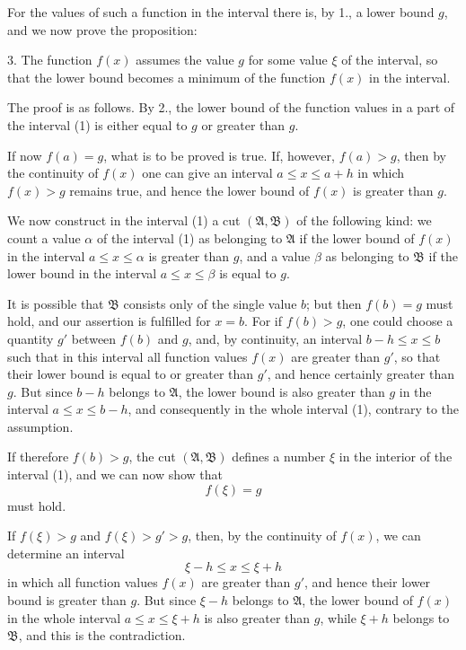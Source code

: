 \documentclass[11pt]{article}
\begin{document}
For the values of such a function in the interval there is, by 1., a lower bound $g$, and we now prove the proposition:

3. The function $f(x)$ assumes the value $g$ for some value $\xi$ of the interval, so that the lower bound becomes a minimum of the function $f(x)$ in the interval.

The proof is as follows. By 2., the lower bound of the function values in a part of the interval (1) is either equal to $g$ or greater than $g$.

If now $f(a)=g$, what is to be proved is true. If, however, $f(a)>g$, then by the continuity of $f(x)$ one can give an interval $a\le x\le a+h$ in which $f(x)>g$ remains true, and hence the lower bound of $f(x)$ is greater than $g$.

We now construct in the interval (1) a cut $(\mathfrak A,\mathfrak B)$ of the following kind: we count a value $\alpha$ of the interval (1) as belonging to $\mathfrak A$ if the lower bound of $f(x)$ in the interval $a\le x\le \alpha$ is greater than $g$, and a value $\beta$ as belonging to $\mathfrak B$ if the lower bound in the interval $a\le x\le \beta$ is equal to $g$.

It is possible that $\mathfrak B$ consists only of the single value $b$; but then $f(b)=g$ must hold, and our assertion is fulfilled for $x=b$. For if $f(b)>g$, one could choose a quantity $g'$ between $f(b)$ and $g$, and, by continuity, an interval $b-h\le x\le b$ such that in this interval all function values $f(x)$ are greater than $g'$, so that their lower bound is equal to or greater than $g'$, and hence certainly greater than $g$. But since $b-h$ belongs to $\mathfrak A$, the lower bound is also greater than $g$ in the interval $a\le x\le b-h$, and consequently in the whole interval (1), contrary to the assumption.

If therefore $f(b)>g$, the cut $(\mathfrak A,\mathfrak B)$ defines a number $\xi$ in the interior of the interval (1), and we can now show that
\begin{equation}
 f(\xi)=g
\tag{3}
\end{equation}
must hold.

If $f(\xi)>g$ and $f(\xi)>g'>g$, then, by the continuity of $f(x)$, we can determine an interval
\[
 \xi-h\le x\le \xi+h
\]
in which all function values $f(x)$ are greater than $g'$, and hence their lower bound is greater than $g$. But since $\xi-h$ belongs to $\mathfrak A$, the lower bound of $f(x)$ in the whole interval $a\le x\le \xi+h$ is also greater than $g$, while $\xi+h$ belongs to $\mathfrak B$, and this is the contradiction.
\end{document}
